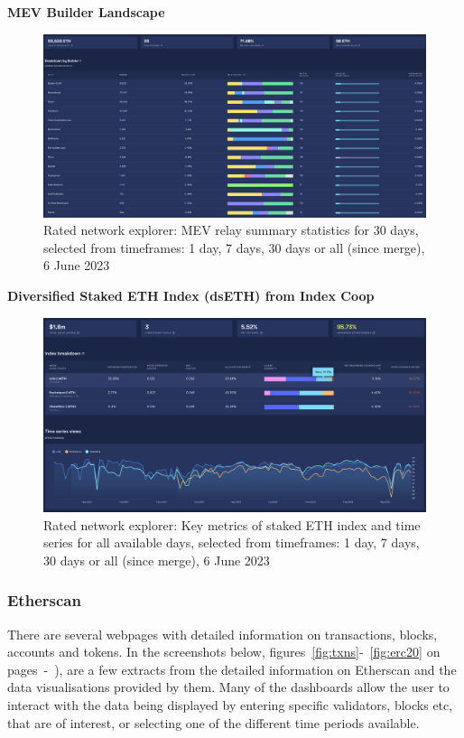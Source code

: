\documentclass[UTF8]{article}
\begin{document}
{\clearpage
\textbf{MEV Builder Landscape}
\begin{figure}[htbp]
\begin{center}
\includegraphics[width=\linewidth]{images/ratedbuilder}
\caption{Rated network explorer: MEV relay summary statistics for 30 days, selected from timeframes: 1 day, 7 days, 30 days or all (since merge), 6 June 2023}
\label{fig:ratedbuilder}
\end{center}
\end{figure}

\textbf{Diversified Staked ETH Index (dsETH) from Index Coop}
\begin{figure}[htbp]
\begin{center}
\includegraphics[width=0.9\linewidth]{images/ratedcoop}
\caption{Rated network explorer: Key metrics of staked ETH index and time series for all available days, selected from timeframes: 1 day, 7 days, 30 days or all (since merge), 6 June 2023}
\label{fig:ratedcoop}
\end{center}
\end{figure}


\clearpage
\subsubsection*{Etherscan}
There are several webpages with detailed information on transactions, blocks, accounts and tokens. In the screenshots below, figures~\ref{fig:txns}-~\ref{fig:erc20} on pages~\pageref{fig:txns}-~\pageref{fig:erc20}), are a few extracts from the detailed information on Etherscan and the data visualisations provided by them. Many of the dashboards allow the user to interact with the data being displayed by entering specific validators, blocks etc, that are of interest, or selecting one of the different time periods available. 

}
\end{document}
